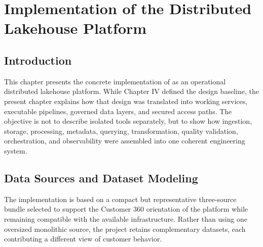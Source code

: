 \chapter{Implementation of the Distributed Lakehouse Platform}

\section{Introduction}
This chapter presents the concrete implementation of \projectname{} as an operational distributed lakehouse platform. While Chapter IV defined the design baseline, the present chapter explains how that design was translated into working services, executable pipelines, governed data layers, and secured access paths. The objective is not to describe isolated tools separately, but to show how ingestion, storage, processing, metadata, querying, transformation, quality validation, orchestration, and observability were assembled into one coherent engineering system.

\section{Data Sources and Dataset Modeling}
The implementation is based on a compact but representative three-source bundle selected to support the Customer 360 orientation of the platform while remaining compatible with the available infrastructure. Rather than using one oversized monolithic source, the project retains complementary datasets, each contributing a different view of customer behavior.

